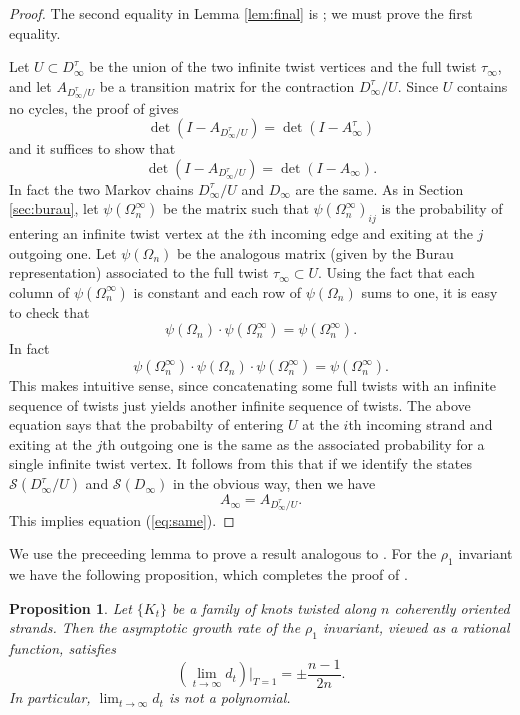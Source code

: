 \documentclass[11pt,hyp,]{nyjm}
\numberwithin{thm}{section}
\newtheorem{prop}[thm]{Proposition}
\theoremstyle{definition}
\theoremstyle{remark}
\begin{document}
	\begin{proof}
		The second equality in Lemma \ref{lem:final} is ; we must prove the first equality.
		
		Let $U \subset D^\tau_\infty$ be the union of the two infinite twist vertices and the full twist $\tau_\infty$, and let $A_{D^\tau_\infty/U}$ be a transition matrix for the contraction $D^\tau_\infty/U$. Since $U$ contains no cycles, the proof of  gives
		$$
		\det(I - A_{D^\tau_\infty/U}) = \det(I - A^\tau_\infty)
		$$
		and it suffices to show that 
		\begin{equation}
			\label{eq:same}
			\det(I - A_{D^\tau_\infty/U}) = \det(I - A_\infty).
		\end{equation}
		In fact the two Markov chains $D^\tau_\infty/U$ and $D_\infty$ are the same. As in Section \ref{sec:burau}, let $\psi(\Omega^\infty_n)$ be the matrix such that $\psi(\Omega^\infty_n)_{ij}$ is the probability of entering an infinite twist vertex at the $i$th incoming edge and exiting at the $j$ outgoing one. Let $\psi(\Omega_n)$ be the analogous matrix (given by the Burau representation) associated to the full twist $\tau_\infty \subset U$. Using the fact that each column of $\psi(\Omega^\infty_n)$ is constant and each row of $\psi(\Omega_n)$ sums to one, it is easy to check that
		$$
		\psi(\Omega_n) \cdot \psi(\Omega^\infty_n) = \psi(\Omega^\infty_n).
		$$
		In fact
		$$
		\psi(\Omega^\infty_n) \cdot \psi(\Omega_n) \cdot \psi(\Omega^\infty_n) = \psi(\Omega^\infty_n).
		$$
		This makes intuitive sense, since concatenating some full twists with an infinite sequence of twists just yields another infinite sequence of twists. The above equation says that the probabilty of entering $U$ at the $i$th incoming strand and exiting at the $j$th outgoing one is the same as the associated probability for a single infinite twist vertex. It follows from this that if we identify the states $\mathcal{S}(D^\tau_\infty/U)$ and $\mathcal{S}(D_\infty)$ in the obvious way, then we have
		$$
		A_\infty = A_{D^\tau_\infty/U}.
		$$
		This implies equation (\ref{eq:same}).
	\end{proof}

	We use the preceeding lemma to prove a result analogous to . For the $\rho_1$ invariant we have the following proposition, which completes the proof of .
	
	\begin{prop}
		\label{thm:rho_limit}
		Let $\{K_t\}$ be a family of knots twisted along $n$ coherently oriented strands. Then the asymptotic growth rate of the $\rho_1$ invariant, viewed as a rational function, satisfies
		$$
		(\lim_{t \to \infty} d_t) |_{T = 1} = \pm \frac{n - 1}{2n}.
		$$
		In particular, $\lim_{t \to \infty} d_t$ is not a polynomial.
	\end{prop}
\end{document}
